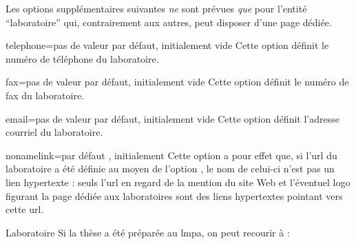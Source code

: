 Les options supplémentaires suivantes \emph{ne} sont prévues
\emph{que} pour l'entité \enquote{laboratoire} qui, contrairement
aux autres, peut disposer d'une page dédiée\pagededieelabo.
%
\begin{docKey}{telephone}{=}{pas de valeur par défaut,
    initialement vide}
  Cette option définit le numéro de téléphone du laboratoire.
\end{docKey}
%
\begin{docKey}{fax}{=}{pas de valeur par défaut,
    initialement vide}
  Cette option définit le numéro de fax du laboratoire.
\end{docKey}
%
\begin{docKey}{email}{=}{pas de valeur par
    défaut, initialement vide}
  Cette option définit l'adresse courriel du laboratoire.
\end{docKey}
%
\begin{docKey}{nonamelink}{=\textbar{}}{par défaut
    , initialement }
%
  Cette option a pour effet que, si l'\acrshort{url} du laboratoire a été
  définie au moyen de l'option , le nom de celui-ci n'est pas un
  lien hypertexte : seuls l'\acrshort{url} en regard de la mention du site Web
  et l'éventuel logo figurant la page dédiée aux laboratoires\pagededieelabo{}
  sont des liens hypertextes pointant vers cette \acrshort{url}.
\end{docKey}
%
\begin{dbexample}{Laboratoire}{}
  Si la thèse a été préparée au \gls{lmpa}, on peut recourir à :
  \NoAutoSpacing%
\begin{preamblecode}[listing options={deletekeywords={url},morekeywords={[2]url}}]
\end{preamblecode}
\end{dbexample}
